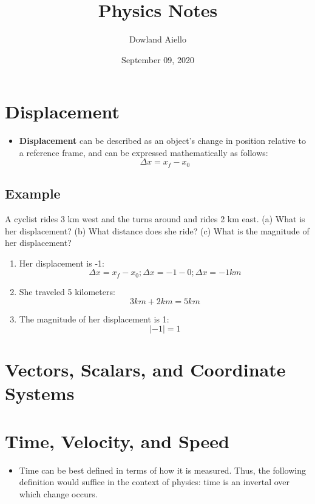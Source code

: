 \documentclass{article}
\begin{document}
\title{Physics Notes}
\author{Dowland Aiello}
\date{September 09, 2020}

\maketitle
\tableofcontents
\fancyhf{}

\newpage

\section{Displacement}

\begin{itemize}
	\item \textbf{Displacement} can be described as an object's change in position relative to a reference frame,
		and can be expressed mathematically as follows:
		\[ \Delta x = x_f - x_0 \]
\end{itemize}

\subsection{Example}

A cyclist rides 3 km west and the turns around and rides 2 km east. (a) What is
her displacement? (b) What distance does she ride? (c) What is the magnitude of
her displacement?

\begin{enumerate}
	\item Her displacement is -1:
		\[ \Delta x = x_f - x_0; \Delta x = -1 - 0; \Delta x = -1 km \]
	\item She traveled 5 kilometers:
		\[ 3km + 2km = 5km \]
	\item The magnitude of her displacement is 1:
		\[ \lvert -1 \rvert = 1 \]
\end{enumerate}

\section{Vectors, Scalars, and Coordinate Systems}

\section{Time, Velocity, and Speed}

\begin{itemize}
	\item Time can be best defined in terms of how it is measured. Thus, the
		following definition would suffice in the context of physics: time is
		an invertal over which change occurs.
\end{itemize}
\end{document}
